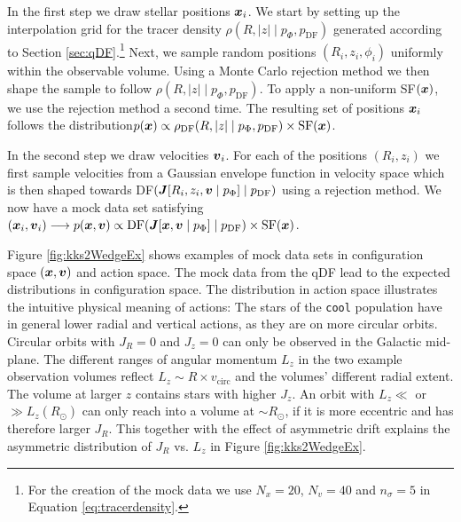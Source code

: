 In the first step we draw stellar positions $\boldsymbol{x}_i$. We start by setting up the interpolation grid for the tracer density $\rho(R,|z| \mid p_\Phi, p_\text{DF})$ generated according to Section \ref{sec:qDF}.\footnote{For the creation of the mock data we use $N_x = 20$, $N_v = 40$ and $n_\sigma=5$ in Equation \ref{eq:tracerdensity}.} Next, we sample random positions $(R_i,z_i,\phi_i)$ uniformly within the observable volume. Using a Monte Carlo rejection method we then shape the sample to follow $\rho(R,|z| \mid p_\Phi, p_\text{DF})$. To apply a non-uniform SF$(\boldsymbol{x})$, we use the rejection method a second time. The resulting set of positions $\boldsymbol{x}_i$ follows the distribution$p(\boldsymbol{x}) \propto \rho_\text{DF}(R,|z| \mid p_{\Phi},p_\text{DF}) \times \text{SF}(\boldsymbol{x})$.

In the second step we draw velocities $\boldsymbol{v}_i$. For each of the positions $(R_i,z_i)$ we first sample velocities from a Gaussian envelope function in velocity space which is then shaped towards DF$(\boldsymbol{J}[R_i,z_i,\boldsymbol{v} \mid p_{\Phi}] \mid p_\text{DF})$ using a rejection method. We now have a mock data set satisfying $(\boldsymbol{x}_i,\boldsymbol{v}_i) \longrightarrow p(\boldsymbol{x},\boldsymbol{v}) \propto \text{DF}(\boldsymbol{J}[\boldsymbol{x},\boldsymbol{v} \mid p_{\Phi}] \mid p_\text{DF}) \times \text{SF}(\boldsymbol{x})$.


Figure \ref{fig:kks2WedgeEx} shows examples of mock data sets in configuration space $(\boldsymbol{x},\boldsymbol{v})$ and action space. The mock data from the qDF lead to the expected distributions in configuration space. The distribution in action space illustrates the intuitive physical meaning of actions: The stars of the \texttt{cool} population have in general lower radial and vertical actions, as they are on more circular orbits. Circular orbits with $J_R = 0$ and $J_z = 0$ can only be observed in the Galactic mid-plane. The different ranges of angular momentum $L_z$ in the two example observation volumes reflect $L_z \sim R  \times v_\text{circ}$ and the volumes' different radial extent. The volume at larger $z$ contains stars with higher $J_z$.  An orbit with $L_z \ll$ or $\gg L_z(R_\odot)$ can only reach into a volume at $\sim R_\odot$, if it is more eccentric and has therefore larger $J_R$. This together with the effect of asymmetric drift explains the asymmetric distribution of $J_R$ vs. $L_z$ in Figure \ref{fig:kks2WedgeEx}.


